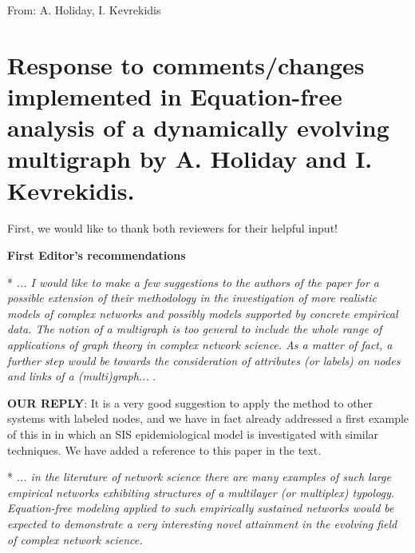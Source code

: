 \documentclass[12pt]{article}
\begin{document}
\begin{flushright}
From: A. Holiday, I. Kevrekidis
\end{flushright}

\vspace{5mm}


\vspace{2mm}

\section*{Response to comments/changes implemented in Equation-free analysis
of a dynamically evolving multigraph by A. Holiday and I. Kevrekidis.}

First, we would like to thank both reviewers for their helpful input!

\vspace{3mm}

\textbf{First Editor's recommendations}
\vspace*{\baselineskip}

* {\em ... I would like to make a few suggestions to the authors of
  the paper for a possible extension of their methodology in the
  investigation of more realistic models of complex networks and
  possibly models supported by concrete empirical data. The notion of
  a multigraph is too general to include the whole range of
  applications of graph theory in complex network science. As a matter
  of fact, a further step would be towards the consideration of
  attributes (or labels) on nodes and links of a (multi)graph... }.

\textbf{OUR REPLY}: It is a very good suggestion to apply the method
to other systems with labeled nodes, and we have in fact already
addressed a first example of this in \cite{kattis_modeling_2016} in which
an SIS epidemiological model is investigated with similar
techniques. We have added a reference to this paper in the text.
\vspace*{\baselineskip}

* {\em ... in the literature of network science there are many
  examples of such large empirical networks exhibiting structures of a
  multilayer (or multiplex) typology. Equation-free modeling applied
  to such empirically sustained networks would be expected to
  demonstrate a very interesting novel attainment in the evolving
  field of complex network science.}
\end{document}

